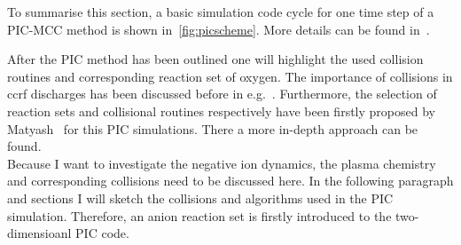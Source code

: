 			To summarise this section, a basic simulation code cycle for one time step of a PIC-MCC method is shown in~\autoref{fig:picscheme}. More details can be found in~\cite{Tskhakaya}.
%
            \par%
            After the PIC method has been outlined one will highlight the used collision routines and corresponding reaction set of oxygen. The importance of collisions in ccrf discharges has been discussed before in e.g.\@~\cite{Surendra93,Bronold07b,Gudmundsson13}. Furthermore, the selection of reaction sets and collisional routines respectively have been firstly proposed by Matyash~\cite{MatyashDiss} for this PIC simulations. There a more in-depth approach can be found.\\
            Because I want to investigate the negative ion dynamics, the plasma chemistry and corresponding collisions need to be discussed here. In the following paragraph and sections I will sketch the collisions and algorithms used in the PIC simulation. Therefore, an anion reaction set is firstly introduced to the two-dimensioanl PIC code.%
            \par%
%            
